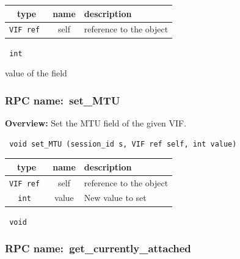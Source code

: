  
\vspace{0.3cm}
\begin{tabular}{|c|c|p{7cm}|}
 \hline
{\bf type} & {\bf name} & {\bf description} \\ \hline
{\tt VIF ref } & self & reference to the object \\ \hline 

\end{tabular}

\vspace{0.3cm}

{\tt 
int
}


value of the field
\vspace{0.3cm}
\vspace{0.3cm}
\vspace{0.3cm}
\subsubsection{RPC name:~set\_MTU}

{\bf Overview:} 
Set the MTU field of the given VIF.

\begin{verbatim} void set_MTU (session_id s, VIF ref self, int value)\end{verbatim}



 
\vspace{0.3cm}
\begin{tabular}{|c|c|p{7cm}|}
 \hline
{\bf type} & {\bf name} & {\bf description} \\ \hline
{\tt VIF ref } & self & reference to the object \\ \hline 

{\tt int } & value & New value to set \\ \hline 

\end{tabular}

\vspace{0.3cm}

{\tt 
void
}



\vspace{0.3cm}
\vspace{0.3cm}
\vspace{0.3cm}
\subsubsection{RPC name:~get\_currently\_attached}

